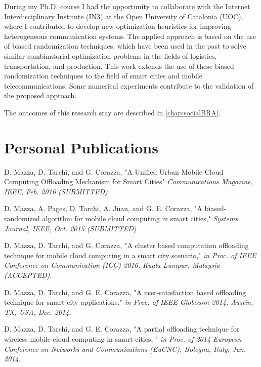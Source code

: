 \documentclass[twoside,openright]{report}
\newcommand{\subscript}[2]{$#1 _ #2$}
\begin{document}
During my Ph.D. course I had the opportunity to collaborate with the Internet Interdisciplinary Institute (IN3) at the Open University of Catalonia (UOC), where I contributed to  develop new optimization heuristics for improving heterogeneous communication systems. 
The applied approach is based on the use of biased randomization techniques, which have been used in the past to solve similar combinatorial optimization problems in the fields of logistics, transportation, and production. 
This work extends the use of these biased randomization techniques to the field of smart cities and mobile telecommunications. 
Some numerical experiments contribute to the validation of the proposed approach.

The outcomes of this research stay are described in \autoref{chap:socialBRA}. 

\section*{Personal Publications}
\begin{enumerate}[label={[}\subscript{P}{\arabic*}{]}]
 \item \label{P1}
   D. Mazza, D. Tarchi, and G. Corazza, {"}A Unified Urban Mobile Cloud Computing Offloading Mechanism for Smart Cities{"} \textit{Communications Magazine, IEEE, Feb. 2016 (SUBMITTED)}
    \item \label{P2}
    D. Mazza, A. Pages, D. Tarchi, A. Juan, and G. E. Corazza, {"}A biased-randomized algorithm for mobile cloud computing in smart cities,{"} \textit{Systems Journal, IEEE, Oct. 2015 (SUBMITTED)}
\item \label{P3}
D. Mazza, D. Tarchi, and G. Corazza, {"}A cluster based computation offloading technique for mobile cloud computing in a smart city scenario,{"} \textit{in Proc. of IEEE Conference on Communication (ICC) 2016, Kuala Lumpur, Malaysia (ACCEPTED).}
\item \label{P4}
D. Mazza, D. Tarchi, and G. E. Corazza,  {"}A user-satisfaction based offloading technique for smart city applications,{"}  \textit{in Proc. of IEEE Globecom 2014, Austin, TX, USA, Dec. 2014.}
\item \label{P5}
D. Mazza, D. Tarchi, and G. E. Corazza,  {"}A partial offloading technique for wireless mobile cloud computing in smart cities, {"} \textit{in Proc. of 2014 European Conference on Networks and Communications (EuCNC), Bologna, Italy, Jun. 2014.}
\end{enumerate}
\end{document}
